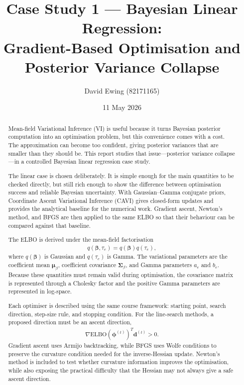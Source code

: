 \documentclass[11pt,a4paper]{article}
\title{
Case Study 1 --- Bayesian Linear Regression:\\[0.4em]
Gradient-Based Optimisation and Posterior Variance Collapse
}
\author{
  David Ewing (82171165)\\
}
\date{11 May 2026}
\newcommand{\ELBO}{\text{ELBO}}
\begin{document}
\maketitle

\begin{abstract}
\setlength{\parindent}{0pt}
\setlength{\parskip}{0.7em}

Mean-field Variational Inference (VI) is useful because it turns Bayesian posterior computation into an optimisation problem, but this convenience comes with a cost. The approximation can become too confident, giving posterior variances that are smaller than they should be. This report studies that issue---posterior variance collapse---in a controlled Bayesian linear regression case study.

The linear case is chosen deliberately. It is simple enough for the main quantities to be checked directly, but still rich enough to show the difference between optimisation success and reliable Bayesian uncertainty. With Gaussian--Gamma conjugate priors, Coordinate Ascent Variational Inference (CAVI) gives closed-form updates and provides the analytical baseline for the numerical work. Gradient ascent, Newton's method, and BFGS are then applied to the same ELBO so that their behaviour can be compared against that baseline.

The ELBO is derived under the mean-field factorisation
\begin{align*}
q(\bm{\beta},\tau_e)=q(\bm{\beta})q(\tau_e),
\end{align*}
where $q(\bm{\beta})$ is Gaussian and $q(\tau_e)$ is Gamma. The variational parameters are the coefficient mean $\bm{\mu}_\beta$, coefficient covariance $\bm{\Sigma}_\beta$, and Gamma parameters $a_e$ and $b_e$. Because these quantities must remain valid during optimisation, the covariance matrix is represented through a Cholesky factor and the positive Gamma parameters are represented in log-space.

Each optimiser is described using the same course framework: starting point, search direction, step-size rule, and stopping condition. For the line-search methods, a proposed direction must be an ascent direction,
\begin{align*}
\nabla\ELBO(\bm{\phi}^{(t)})^T\bm{d}^{(t)} > 0.
\end{align*}
Gradient ascent uses Armijo backtracking, while BFGS uses Wolfe conditions to preserve the curvature condition needed for the inverse-Hessian update. Newton's method is included to test whether curvature information improves the optimisation, while also exposing the practical difficulty that the Hessian may not always give a safe ascent direction.


\end{abstract}
\end{document}
